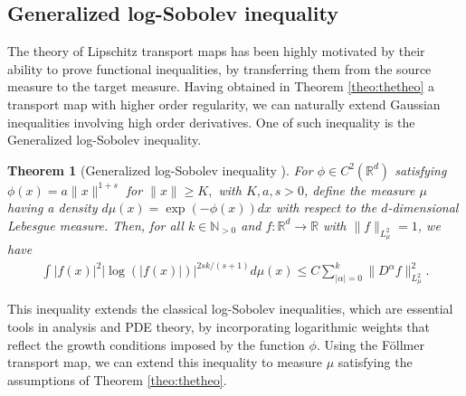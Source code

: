 \documentclass{article}
\newtheorem{theorem}{Theorem}
\begin{document}
\subsection{Generalized log-Sobolev inequality}
The theory of Lipschitz transport maps has been highly motivated by their ability to prove functional inequalities, by transferring them from
the source measure to the target measure. Having obtained in Theorem \ref{theo:thetheo} a transport map with higher order regularity, we can  naturally extend Gaussian inequalities involving high order derivatives. One of such inequality is the Generalized log-Sobolev inequality.
\begin{theorem}[Generalized log-Sobolev inequality \cite{rosen1976sobolev}]\label{theo:wsobo} For $\phi\in C^2(\mathbb{R}^d)$ satisfying $\phi(x)=a\|x\|^{1+s}$ for $\|x\|\geq K,$ with $ K,a,s>0$, define the measure $\mu$ having a density $d\mu(x) = \exp(-\phi(x))dx$ with respect to the $d$-dimensional Lebesgue measure. Then, for all $k\in \mathbb{N}_{>0}$ and $f:\mathbb{R}^d\rightarrow \mathbb{R}$ with $\|f\|_{L_{\mu}^2}=1$, we have
\begin{align*}
    \int |f(x)|^2|\log(|f(x)|)|^{2sk/(s+1)}d\mu(x)\leq C \sum_{|\alpha|=0}^k\|D^\alpha f\|^2_{L_{\mu}^2}.
\end{align*}
    
\end{theorem}
This inequality extends the classical log-Sobolev inequalities, which are essential tools in analysis and PDE theory, by incorporating logarithmic weights that reflect the growth conditions imposed by the function $\phi$. Using the Föllmer transport map, we can extend this inequality to measure $\mu$ satisfying the assumptions of Theorem \ref{theo:thetheo}.
\end{document}
